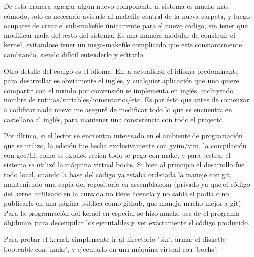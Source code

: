 De esta manera agregar algún nuevo componente al sistema es mucho más cómodo,
solo es necesario avisarle al makefile central de la nueva carpeta, y luego
ocuparse de crear el sub-makefile únicamente para el nuevo código, sin tener que
modificar nada del resto del sistema. Es una manera modular de construir el
kernel, evitandose tener un mega-makefile complicado que este constantemente
cambiando, siendo difícil entenderlo y editarlo.

Otro detalle del código es el idioma. En la actualidad el idioma predominante
para desarrollar es obviamente el inglés, y cualquier aplicación que uno quiere
compartir con el mundo por convensión se implementa en inglés, incluyendo nombre
de rutinas/variables/comentarios/etc. Es por ésto que antes de comenzar a
codificar nada nuevo me aseguré de modificar todo lo que se encuentra en
castellano al inglés, para mantener una consistencia con todo el projecto.

Por último, si el lector se encuentra interesado en el ambiente de programación
que se utilizo, la edición fue hecha exclusivamente con gvim/vim, la compilación
con gcc/ld, como se explicó recien todo se pega con make, y para testear el
sistema se utilizó la máquina virtual bochs. Si bien al principio el desarrollo
fue todo local, cuando la base del código ya estaba ordenada la manejé con git,
manteniendo una copia del repositorio en assembla.com (privado ya que el código
del kernel utilizado en la cursada no tiene licencia y no sabía si podía o no
publicarlo en una página pública como github, que maneja mucho mejor a git).
Para la programación del kernel en especial se hizo mucho uso de el programa
objdump, para decompilar los ejecutables y ver exactamente el código producido.

Para probar el kernel, simplemente ir al directorio 'bin', armar el diskette
booteable con 'make', y ejecutarlo en una máquina virtual con 'bochs'.
